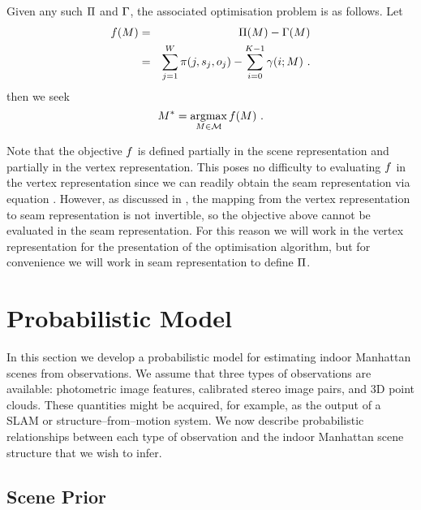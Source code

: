 Given any such $\ScenePayoff$ and $\ScenePenalty$, the associated
optimisation problem is as follows. Let
\begin{eqnarray}
  \label{eq:scene-objective}
  \Objective(\Scene) &=&
  \ScenePayoff(\Scene) - \ScenePenalty(\Scene)\\
  &=&
  \sum_{j=1}^{\Width} \PixelPayoff(j,\seam_j,\WallOrient_j) -
  \sum_{i=0}^{\NumWalls-1} \CornerPenalty(i;\Scene) ~.
\end{eqnarray}
then we seek
\begin{equation}
  \label{eq:opt-scene}
  \OptimalScene = \argmax_{\Scene\in\SetOfScenes}\limits \Objective(\Scene) ~.
\end{equation}

Note that the objective $\Objective$ is defined partially in the scene
representation and partially in the vertex representation. This poses
no difficulty to evaluating $\Objective$ in the vertex representation
since we can readily obtain the seam representation via equation
. However, as discussed in
, the mapping from the vertex
representation to seam representation is not invertible, so the
objective above cannot be evaluated in the seam representation. For
this reason we will work in the vertex representation for the
presentation of the optimisation algorithm, but for convenience we
will work in seam representation to define  $\ScenePayoff$.

\section{Probabilistic Model}

In this section we develop a probabilistic model for estimating indoor
Manhattan scenes from observations. We assume that three types of
observations are available: photometric image features, calibrated
stereo image pairs, and 3D point clouds. These quantities might be
acquired, for example, as the output of a SLAM or
structure--from--motion system. We now describe probabilistic
relationships between each type of observation and the indoor
Manhattan scene structure that we wish to infer.

\subsection{Scene Prior}

